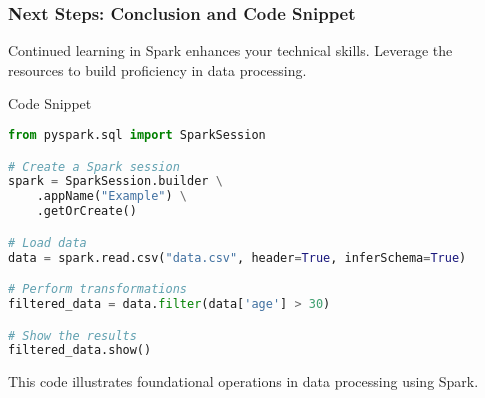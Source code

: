 \documentclass[aspectratio=169]{beamer}
\begin{document}
\begin{frame}[fragile]
    \frametitle{Next Steps: Conclusion and Code Snippet}
    Continued learning in Spark enhances your technical skills. Leverage the resources to build proficiency in data processing.
    
    \begin{block}{Code Snippet}
    \begin{lstlisting}[language=Python, backgroundcolor=\color{mycolor}]
from pyspark.sql import SparkSession

# Create a Spark session
spark = SparkSession.builder \
    .appName("Example") \
    .getOrCreate()

# Load data
data = spark.read.csv("data.csv", header=True, inferSchema=True)

# Perform transformations
filtered_data = data.filter(data['age'] > 30)

# Show the results
filtered_data.show()
    \end{lstlisting}
    \end{block}

    This code illustrates foundational operations in data processing using Spark.
\end{frame}
\end{document}
